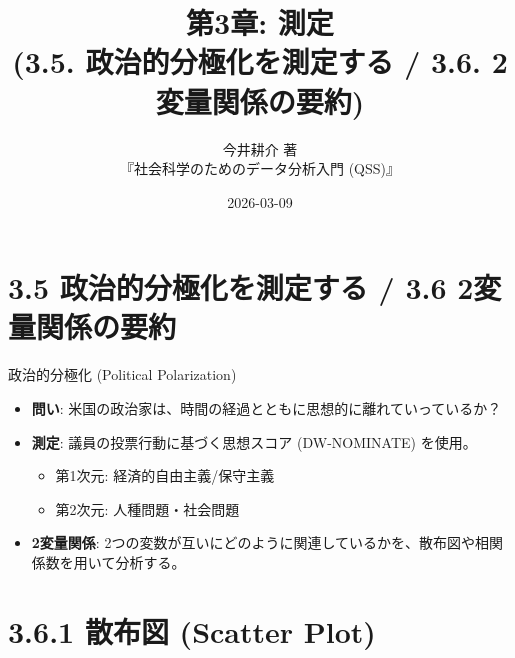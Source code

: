 \documentclass[
  ignorenonframetext,
]{beamer}
\title{第3章: 測定\\
(3.5. 政治的分極化を測定する / 3.6. 2変量関係の要約)}
\subtitle{今井耕介 著\\
『社会科学のためのデータ分析入門 (QSS)』}
\author{}
\date{\vspace{-2.5em}2026-03-09}
\providecommand{\tightlist}{%
  \setlength{\itemsep}{0pt}\setlength{\parskip}{0pt}}
\begin{document}
\frame{\titlepage}

\hypertarget{ux653fux6cbbux7684ux5206ux6975ux5316ux3092ux6e2cux5b9aux3059ux308b-3.6-2ux5909ux91cfux95a2ux4fc2ux306eux8981ux7d04}{%
\section{3.5 政治的分極化を測定する / 3.6
2変量関係の要約}\label{ux653fux6cbbux7684ux5206ux6975ux5316ux3092ux6e2cux5b9aux3059ux308b-3.6-2ux5909ux91cfux95a2ux4fc2ux306eux8981ux7d04}}

\begin{frame}{政治的分極化 (Political Polarization)}
\protect\hypertarget{ux653fux6cbbux7684ux5206ux6975ux5316-political-polarization}{}
\begin{itemize}
\tightlist
\item
  \textbf{問い}:
  米国の政治家は、時間の経過とともに思想的に離れていっているか？
\item
  \textbf{測定}: 議員の投票行動に基づく思想スコア (DW-NOMINATE) を使用。

  \begin{itemize}
  \tightlist
  \item
    第1次元: 経済的自由主義/保守主義
  \item
    第2次元: 人種問題・社会問題
  \end{itemize}
\item
  \textbf{2変量関係}:
  2つの変数が互いにどのように関連しているかを、散布図や相関係数を用いて分析する。
\end{itemize}
\end{frame}

\hypertarget{ux6563ux5e03ux56f3-scatter-plot}{%
\section{3.6.1 散布図 (Scatter
Plot)}\label{ux6563ux5e03ux56f3-scatter-plot}}
\end{document}
